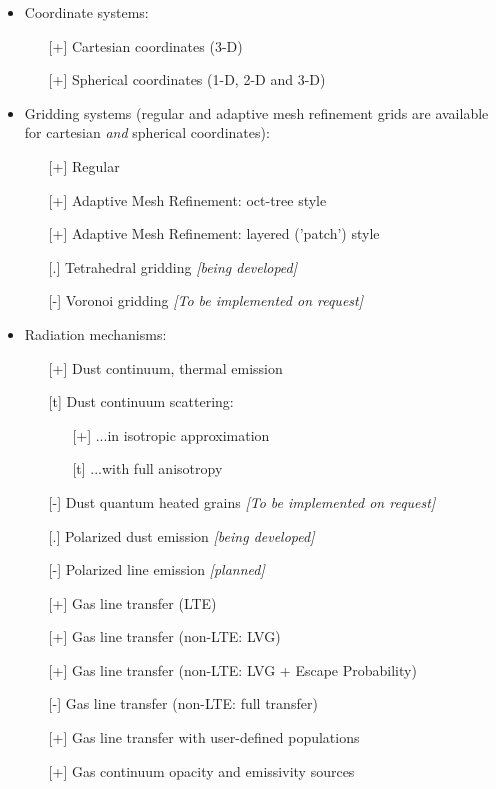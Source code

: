 \documentclass{report}
\begin{document}
\begin{itemize}
\item Coordinate systems:
  \begin{itemize}
    \item[][+] Cartesian coordinates (3-D)
    \item[][+] Spherical coordinates (1-D, 2-D and 3-D)
  \end{itemize}
\item Gridding systems (regular and adaptive mesh refinement grids are
  available for cartesian {\em and} spherical coordinates):
  \begin{itemize}
    \item[][+] Regular
    \item[][+] Adaptive Mesh Refinement: oct-tree style
    \item[][+] Adaptive Mesh Refinement: layered ('patch') style
    \item[][.] Tetrahedral gridding {\em [being developed]}
    \item[][-] Voronoi gridding {\em [To be implemented on request]}
  \end{itemize}
\item Radiation mechanisms:
  \begin{itemize}
    \item[][+] Dust continuum, thermal emission
    \item[][t] Dust continuum scattering:
      \begin{itemize}
      \item[][+] ...in isotropic approximation
      \item[][t] ...with full anisotropy
      \end{itemize}
    \item[][-] Dust quantum heated grains {\em [To be implemented on request]}
    \item[][.] Polarized dust emission {\em [being developed]}
    \item[][-] Polarized line emission {\em [planned]}
    \item[][+] Gas line transfer (LTE)
    \item[][+] Gas line transfer (non-LTE: LVG)
    \item[][+] Gas line transfer (non-LTE: LVG + Escape Probability)
    \item[][-] Gas line transfer (non-LTE: full transfer)
    \item[][+] Gas line transfer with user-defined populations
    \item[][+] Gas continuum opacity and emissivity sources

\end{itemize}
\end{itemize}
\end{document}
